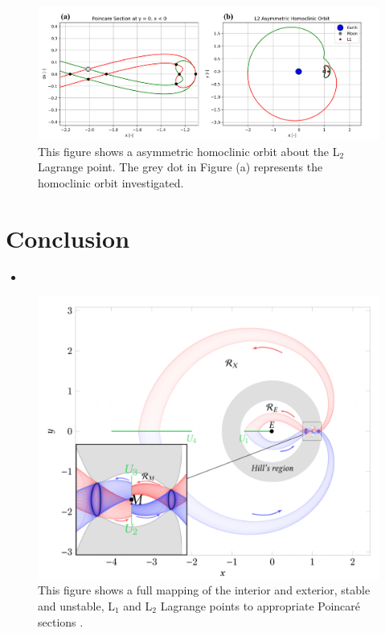 \documentclass[11pt]{article} %
\begin{document}
\begin{figure}[H]
    \centering
    \includegraphics[width=\textwidth]{asym_homo_comb.png}
    \caption{This figure shows a asymmetric homoclinic orbit about the L$_2$ Lagrange point. The grey dot in Figure (a) represents the homoclinic orbit investigated.}
    \label{f:asym_homo}
\end{figure}


\section{Conclusion}
\begin{itemize}
	\item \color{red}{Homoclinic orbits are cool/interesting and super difficult to find. Can tell you a lot about the flow of a dynamical system. Realistically, can help target POs from far away. However,Heteroclinic orbits are useful fa show ... moving around a single system or even patching together for transfers. Bitch we out.}\color{black}
\end{itemize}

\begin{figure}[H]
    \centering
    \includegraphics[width=5in]{interior_exterior.png}
    \caption{This figure shows a full mapping of the interior and exterior, stable and unstable, L$_1$ and L$_2$ Lagrange points to appropriate Poincar\'{e} sections \cite{KoonLoMarsdenRoss2011}.}
    \label{f:interior_exterior}
\end{figure}

\newpage


\end{document}
